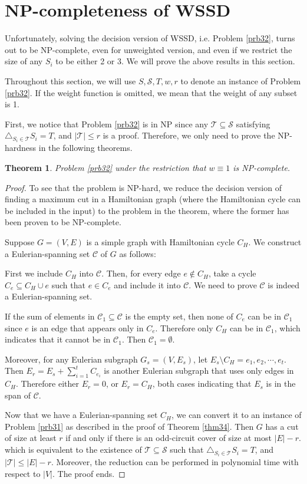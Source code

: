 \documentclass[10pt,fleqn]{article}
\newtheorem{theorem}{Theorem}[section]
\newcommand{\rs}{\setminus}
\newcommand{\mc}[1]{\mathcal{#1}}
\begin{document}
	\section{NP-completeness of WSSD}\label{a1}
	Unfortunately, solving the decision version of WSSD, i.e. Problem \ref{prb32}, turns out to be NP-complete, even for unweighted version, and even if we restrict the size of any $S_i$ to be either 2 or 3. We will prove the above results in this section. \par
	Throughout this section, we will use $S,\mc{S},T,w,r$ to denote an instance of Problem \ref{prb32}. If the weight function is omitted, we mean that the weight of any subset is 1. \par
	First, we notice that Problem \ref{prb32} is in NP since any $\mc{T}\subseteq\mc{S}$ satisfying $\triangle_{S_i\in \mc{T}}S_i=T$, and $|\mc{T}|\leq r$ is a proof. Therefore, we only need to prove the NP-hardness in the following theorems.
	\begin{theorem}\label{thm41}
		Problem \ref{prb32} under the restriction that $w\equiv 1$ is NP-complete.
	\end{theorem}
	\begin{proof}
		To see that the problem is NP-hard, we reduce the decision version of finding a maximum cut in a Hamiltonian graph (where the Hamiltonian cycle can be included in the input) to the problem in the theorem, where the former has been proven to be NP-complete. \par
		Suppose $G=(V,E)$ is a simple graph with Hamiltonian cycle $C_H$. We construct a Eulerian-spanning set $\mc{C}$ of $G$ as follows: \par
		First we include $C_H$ into $\mc{C}$. Then, for every edge $e\notin C_H$, take a cycle $C_e\subseteq C_H\cup e$ such that $e\in C_e$ and include it into $\mc{C}$. We need to prove $\mc{C}$ is indeed a Eulerian-spanning set.\par
		If the sum of elements in $\mc{C}_1\subseteq\mc{C}$ is the empty set, then none of $C_e$ can be in $\mc{C}_1$ since $e$ is an edge that appears only in $C_e$. Therefore only $C_H$ can be in $\mc{C}_1$, which indicates that it cannot be in $\mc{C}_1$. Then $\mc{C}_1=\emptyset$. \par
		Moreover, for any Eulerian subgraph $G_s=(V,E_s)$, let $E_s\rs C_H={e_1,e_2,\cdots,e_t}$. Then $E_r=E_s+\sum_{i=1}^{t}C_{e_i}$ is another Eulerian subgraph that uses only edges in $C_H$. Therefore either $E_r=0$, or $E_r=C_H$, both cases indicating that $E_s$ is in the span of $\mc{C}$. \par
		Now that we have a Eulerian-spanning set $C_H$, we can convert it to an instance of Problem \ref{prb31} as described in the proof of Theorem \ref{thm34}. Then $G$ has a cut of size at least $r$ if and only if there is an odd-circuit cover of size at most $|E|-r$. which is equivalent to the existence of $\mc{T}\subseteq\mc{S}$ such that $\triangle_{S_i\in\mc{T}}S_i=T$, and $|\mc{T}|\leq |E|-r$. Moreover, the reduction can be performed in polynomial time with respect to $|V|$. The proof ends.
	\end{proof}
\end{document}
